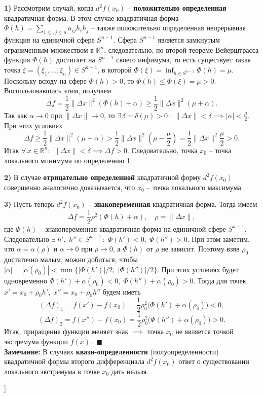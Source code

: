 \textbf{1)} Рассмотрим случай, когда $d^2 f(x_0)$ -- \textbf{положительно определенная} квадратичная форма. 
В этом случае квадратичная форма $\Phi(h) = \sum_{1\leq , j \leq n} a_{ij}h_i h_j$ -- также положительно определенная непрерывная функция на единичной сфере $S^{n-1}$. 
Сфера $S^{n-1}$ является замкнутым ограниченным множеством в $\mathbb{R}^n$, следовательно, по второй теореме Вейерштрасса функция $\Phi(h)$ достигает на $S^{n-1}$ своего инфимума, то есть существует такая точка $\xi = (\xi_1, \ldots, \xi_n) \in S^{n-1}$, в которой $\Phi(\xi) = \inf_{h \in S^{n-1}} \Phi(h) = \mu$. 
Поскольку всюду на сфере $\Phi(h) > 0$, то $\Phi(h) \leq \Phi(\xi) = \mu > 0$. Воспользовавшись этим, получаем 
$$
\Delta f = \frac{1}{2} \|\Delta x\|^2 (\Phi(h) + \alpha) \geq \frac{1}{2} \|\Delta x\|^2 (\mu + \alpha).
$$
Так как $\alpha \to 0$ при $\|\Delta x\| \to 0$, то $\exists \, \delta = \delta (\mu) > 0 \,:\; \|\Delta x\| < \delta \implies |\alpha| < \frac{\mu}{2}$.
При этих условиях 
$$
\Delta f \geq \frac{1}{2} \|\Delta x\|^2 (\mu + \alpha) > \frac{1}{2} \|\Delta x\|^2 (\mu - \frac{\mu}{2}) = \frac{1}{2} \|\Delta x\|^2 \frac{\mu}{2} > 0.
$$
Итак $\forall\, x \in \mathbb{R}^n : \; \|\Delta x\| < \delta \implies \Delta f > 0 $. Следовательно, точка $x_0$ -- точка локального минимума по определению 1.

\textbf{2)} В случае \textbf{отрицательно определенной} квадратичной форму $d^2 f(x_0)$ совершенно аналогично доказывается, что $x_0$ -- точка локального максимума.

\textbf{3)} Пусть теперь $d^2 f(x_0)$ -- \textbf{знакопеременная} квадратичная форма. Тогда имеем 
$$
\Delta f = \frac{1}{2} \rho^2 (\Phi(h) + \alpha),\quad \rho = \|\Delta x\|,
$$
где $\Phi(h)$ -- знакопеременная квадратичная форма на единичной сфере $S^{n-1}$. 
Следовательно $ \exists \; h', \; h'' \in S^{n-1} \,: \; \Phi(h') <0, \; \Phi(h'') > 0$. 
При этом заметим, что $\alpha = \alpha (\rho)$ и $\alpha \to 0$ при $\rho \to 0$, а $\Phi(h)$ от $\rho$ не зависит.
Поэтому взяв $\rho_0$ достаточно малым, можно добиться, чтобы $|\alpha| = |\alpha(\rho_0)| < \min \big\{|\Phi(h')| / 2, \;  |\Phi(h'')| / 2\big\}$. 
При этих условиях будет одновременно $ \Phi(h') + \alpha(\rho_0) < 0, \; \Phi(h'') + \alpha(\rho_0) > 0$. 
Тогда для точек $x' = x_0 + \rho_0 h', \; x'' = x_0 + \rho_0 h''$ будем иметь
$$
(\Delta f)_1 = f(x') - f(x_0) = \frac{1}{2} \rho_0^2 \big(\Phi(h') + \alpha(\rho_0) \big) < 0,
$$
$$
(\Delta f)_2 = f(x'') - f(x_0) = \frac{1}{2} \rho_0^2 \big(\Phi(h'') + \alpha(\rho_0) \big) > 0.
$$
Итак, приращение функции меняет знак $\implies$ точка $x_0$ не является точкой экстремума функции $f(x)$. $\;\blacksquare$\\

\textbf{Замечание:} В случаях \textbf{квази-определенности} (полуопределенности) квадратичной формы второго дифференциала $d^2 f(x_0)$ ответ о существовании локального экстремума в точке $x_0$ дать нельзя.


\bigbreak
[\cite[page 69-74]{Sadovn_func_mhogih}]